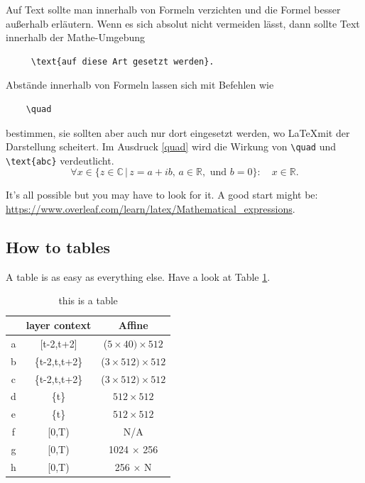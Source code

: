 Auf Text sollte man innerhalb von Formeln verzichten und die Formel besser außerhalb erläutern. Wenn es sich absolut nicht vermeiden lässt, dann sollte Text innerhalb der Mathe-Umgebung
\begin{verbatim}
     \text{auf diese Art gesetzt werden}.
\end{verbatim}
Abstände innerhalb von Formeln lassen sich mit Befehlen wie
\begin{verbatim}
    \quad
\end{verbatim}
bestimmen, sie sollten aber auch nur dort eingesetzt werden, wo \LaTeX mit der Darstellung scheitert. Im Ausdruck  \eqref{quad} wird die Wirkung von \verb|\quad| und \verb|\text{abc}| verdeutlicht.
\begin{equation}
    \label{quad}
    \forall x\in \{ z\in\mathbb{C} \,|\, z = a+ib,\,a\in\mathbb{R},\text{ und }b = 0\}:\quad x\in \mathbb{R}.
\end{equation}


It's all possible but you may have to look for it.
A good start might be:
\url{https://www.overleaf.com/learn/latex/Mathematical_expressions}.

\subsection{How to tables}
A table is as easy as everything else. Have a look at Table \ref{table}.
\begin{table}[H]
    \caption{this is a table}
    \label{table}
    \small
    \centering
    \setlength{\tabcolsep}{4.5pt}
    \begin{tabular}{|c|c|c|}
        \hline
         & layer context & Affine  \\
        \hline
            a  & [t-2,t+2]     & ($5 \times 40)  \times 512$  \\
            b  & \{t-2,t,t+2\} & ($3 \times 512) \times 512$  \\
            c  & \{t-2,t,t+2\} & ($3 \times 512) \times 512$  \\
            d  & \{t\}         & $512 \times 512$  \\
            e  & \{t\}         & $512 \times 512$  \\
            f  & [0,T) & N/A  \\
            g & [0,T) & 1024 $\times$ 256  \\
            h  & [0,T) & 256 $\times$ N \\
        \hline
    \end{tabular}
\end{table}

